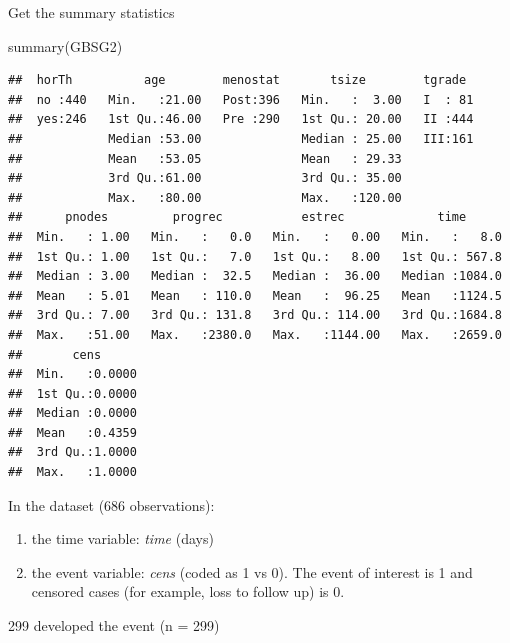 \documentclass[
]{book}
\makeatletter
\newenvironment{Shaded}{\begin{snugshade}}{\end{snugshade}}
\newcommand{\FunctionTok}[1]{\textcolor[rgb]{0,0,0}{#1}}
\newcommand{\NormalTok}[1]{#1}
\newcommand{\SpecialCharTok}[1]{\textcolor[rgb]{0,0,0}{#1}}
\providecommand{\tightlist}{%
  \setlength{\itemsep}{0pt}\setlength{\parskip}{0pt}}
\newenvironment{kframe}{%
\medskip{}
\setlength{\fboxsep}{.8em}
 \def\at@end@of@kframe{}%
 \ifinner\ifhmode%
  \def\at@end@of@kframe{\end{minipage}}%
  \begin{minipage}{\columnwidth}%
 \fi\fi%
 \def\FrameCommand##1{\hskip\@totalleftmargin \hskip-\fboxsep
 \colorbox{shadecolor}{##1}\hskip-\fboxsep
     \hskip-\linewidth \hskip-\@totalleftmargin \hskip\columnwidth}%
 \MakeFramed {\advance\hsize-\width
   \@totalleftmargin\z@ \linewidth\hsize
   \@setminipage}}%
 {\par\unskip\endMakeFramed%
 \at@end@of@kframe}
\renewenvironment{Shaded}{\begin{kframe}}{\end{kframe}}
\makeatother
\begin{document}
Get the summary statistics

\begin{Shaded}
\begin{Highlighting}[]
\FunctionTok{summary}\NormalTok{(GBSG2)}
\end{Highlighting}
\end{Shaded}

\begin{verbatim}
##  horTh          age        menostat       tsize        tgrade   
##  no :440   Min.   :21.00   Post:396   Min.   :  3.00   I  : 81  
##  yes:246   1st Qu.:46.00   Pre :290   1st Qu.: 20.00   II :444  
##            Median :53.00              Median : 25.00   III:161  
##            Mean   :53.05              Mean   : 29.33            
##            3rd Qu.:61.00              3rd Qu.: 35.00            
##            Max.   :80.00              Max.   :120.00            
##      pnodes         progrec           estrec             time       
##  Min.   : 1.00   Min.   :   0.0   Min.   :   0.00   Min.   :   8.0  
##  1st Qu.: 1.00   1st Qu.:   7.0   1st Qu.:   8.00   1st Qu.: 567.8  
##  Median : 3.00   Median :  32.5   Median :  36.00   Median :1084.0  
##  Mean   : 5.01   Mean   : 110.0   Mean   :  96.25   Mean   :1124.5  
##  3rd Qu.: 7.00   3rd Qu.: 131.8   3rd Qu.: 114.00   3rd Qu.:1684.8  
##  Max.   :51.00   Max.   :2380.0   Max.   :1144.00   Max.   :2659.0  
##       cens       
##  Min.   :0.0000  
##  1st Qu.:0.0000  
##  Median :0.0000  
##  Mean   :0.4359  
##  3rd Qu.:1.0000  
##  Max.   :1.0000
\end{verbatim}

In the dataset (686 observations):

\begin{enumerate}
\def\labelenumi{\arabic{enumi}.}
\tightlist
\item
  the time variable: \emph{time} (days)
\item
  the event variable: \emph{cens} (coded as 1 vs 0). The event of interest is 1 and censored cases (for example, loss to follow up) is 0.
\end{enumerate}

299 developed the event (n = 299)

\begin{Shaded}
\end{Shaded}
\end{document}
